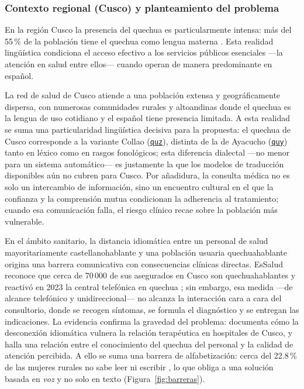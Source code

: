 \documentclass[12pt,a4paper]{article}
\newcommand{\obsdos}[1]{\textcolor{verdeOK}{#1}}
\newenvironment{bloqueObsDos}{\par\color{verdeOK}}{\par}
\DeclareRobustCommand{\sig}[1]{\hyperlink{sig:#1}{\texttt{#1}}}
\begin{document}
\subsubsection{\obsdos{Contexto regional (Cusco) y planteamiento del problema}}
En la regi{\'o}n Cusco la presencia del quechua es particularmente intensa: m{\'a}s del
55\,\% de la poblaci{\'o}n tiene el quechua como lengua materna \parencite{essalud2023}. Esta
realidad ling{\"u}{\'i}stica condiciona el acceso efectivo a los servicios p{\'u}blicos
esenciales ---la atenci{\'o}n en salud entre ellos--- cuando operan de manera predominante en
espa{\~n}ol.

\begin{bloqueObsDos}
\noindent La red de salud de Cusco atiende a una poblaci{\'o}n extensa y geogr{\'a}ficamente
dispersa, con numerosas comunidades rurales y altoandinas donde el quechua es la lengua de uso
cotidiano y el espa{\~n}ol tiene presencia limitada. A esta realidad se suma una particularidad
ling{\"u}{\'i}stica decisiva para la propuesta: el quechua de Cusco corresponde a la variante Collao
(\sig{quz}), distinta de la de Ayacucho (\sig{quy}) tanto en l{\'e}xico como en rasgos
fonol{\'o}gicos; esta diferencia dialectal ---no menor para un sistema autom{\'a}tico--- es
justamente la que los modelos de traducci{\'o}n disponibles a{\'u}n no cubren para Cusco. Por
a{\~n}adidura, la consulta m{\'e}dica no es solo un intercambio de informaci{\'o}n, sino un encuentro
cultural en el que la confianza y la comprensi{\'o}n mutua condicionan la adherencia al tratamiento;
cuando esa comunicaci{\'o}n falla, el riesgo cl{\'i}nico recae sobre la poblaci{\'o}n m{\'a}s
vulnerable.
\end{bloqueObsDos}

En el {\'a}mbito sanitario, la distancia idiom{\'a}tica entre un personal de salud mayoritariamente
castellanohablante y una poblaci{\'o}n usuaria quechuahablante origina una barrera comunicativa con
consecuencias cl{\'i}nicas directas. EsSalud reconoce que cerca de 70\,000 de sus asegurados en
Cusco son quechuahablantes y reactiv{\'o} en 2023 la central telef{\'o}nica en quechua
\parencite{essalud2023}; sin embargo, \obsdos{esa medida ---de alcance telef{\'o}nico y
unidireccional--- no alcanza} la interacci{\'o}n cara a cara del
consultorio, donde se recogen s{\'i}ntomas, se formula el diagn{\'o}stico y se entregan las
indicaciones. La evidencia confirma la gravedad del problema: \textcite{begazo2026} documenta
c{\'o}mo la desconexi{\'o}n idiom{\'a}tica vulnera la relaci{\'o}n terap{\'e}utica en hospitales de
Cusco, y \textcite{cuaila2022} halla una relaci{\'o}n entre el conocimiento del quechua del personal
y la calidad de atenci{\'o}n percibida. A ello se suma una barrera de alfabetizaci{\'o}n: cerca del
22.8\,\% de las mujeres rurales no sabe leer ni escribir \parencite{inei2023}, lo que obliga a una
soluci{\'o}n basada en \emph{voz} y no solo en texto (Figura~\ref{fig:barreras}).
\end{document}
